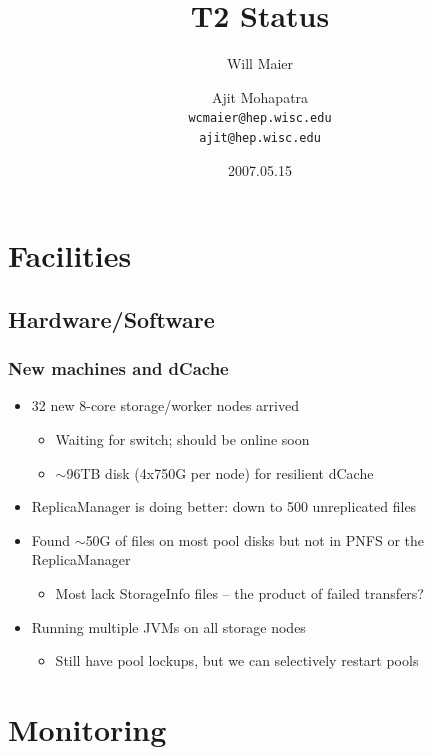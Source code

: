 \documentclass{beamer}
\title{T2 Status}
\author[Maier, Mohapatra]{
    Will Maier \and Ajit Mohapatra\\ 
    {\tt wcmaier@hep.wisc.edu}\\
    {\tt ajit@hep.wisc.edu}}
\institute[Wisconsin]{University of Wisconsin - High Energy Physics}
\date{2007.05.15}
\newcommand{\ca}{\ensuremath{\sim}}
\begin{document}
\begin{frame}
    \titlepage
\end{frame}


\section{Facilities}
\subsection{Hardware/Software}
\begin{frame}
\frametitle{New machines and dCache}
\begin{itemize}
    \item 32 new 8-core storage/worker nodes arrived
    \begin{itemize}
        \item Waiting for switch; should be online soon
        \item \ca{}96TB disk (4x750G per node) for resilient dCache
    \end{itemize}
    \item ReplicaManager is doing better: down to 500 unreplicated files
    \item Found \ca{}50G of files on most pool disks but not in PNFS or the 
    ReplicaManager
    \begin{itemize}
        \item Most lack StorageInfo files -- the product of failed transfers?
    \end{itemize}
    \item Running multiple JVMs on all storage nodes
    \begin{itemize}
        \item Still have pool lockups, but we can selectively restart pools
    \end{itemize}
\end{itemize}
\end{frame}

\section{Monitoring}
\end{document}
